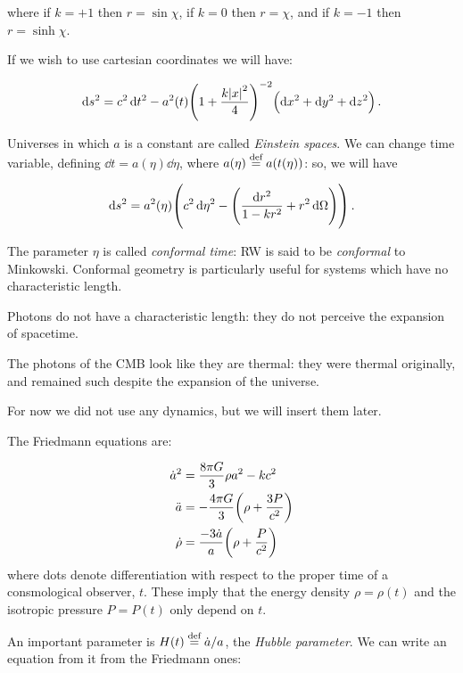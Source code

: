 \documentclass[main.tex]{subfiles}
\begin{document}
where if \(k = +1\)  then \(r = \sin \chi\), if \(k=0\)  then \(r=\chi\), and if \(k = -1\) then \(r = \sinh \chi\).

If we wish to use cartesian coordinates we will have:

\begin{equation}
  \dd{s^2} = c^2 \dd{t^2} - a^2 (t) \qty(1 + \frac{k \abs{x}^2}{4} )^{-2} \qty(\dd{x^2} + \dd{y^2} + \dd{z^2}) \,.
\end{equation}

Universes in which \(a\) is a constant are called \emph{Einstein spaces}.
We can change time variable, defining \(\dd{t} = a(\eta) \dd{\eta} \), where \(a(\eta) \stackrel{\text{def}}{=} a(t(\eta))\):  so, we will have

\begin{equation}
  \dd{s^2} = a^2 (\eta) \qty(c^2 \dd{\eta^2} - \qty(\frac{\dd{r^2}}{1 - kr^2} + r^2 \dd{\Omega})) \,.
\end{equation}

The parameter \(\eta\) is called \emph{conformal time}: RW is said to be \emph{conformal} to Minkowski.
Conformal geometry is particularly useful for systems which have no characteristic length.

Photons do not have a characteristic length: they do not perceive the expansion of spacetime.

The photons of the CMB look like they are thermal: they were thermal originally, and remained such despite the expansion of the universe.

For now we did not use any dynamics, but we will insert them later.

The Friedmann equations are:

\begin{subequations}
\begin{align}
    \dot{a}^2 &= \frac{8 \pi G }{3} \rho a^2 - kc^2  \\
    \ddot{a} &= - \frac{4 \pi G }{3}  \qty(\rho  + \frac{3P}{c^2} )  \\
    \dot{\rho} &= \frac{-3 \dot{a} }{a} \qty(\rho + \frac{P}{c^2} )
\end{align}
\end{subequations}
%
where dots denote differentiation with respect to the proper time of a consmological observer, \(t\).
These imply that the energy density \(\rho = \rho( t)\) and the isotropic pressure \(P = P(t)\) only depend on \(t\).

An important parameter is \(H(t) \stackrel{\text{def}}{=} \dot{a} / a\), the \emph{Hubble parameter}.
We can write an equation from it from the Friedmann ones:
\end{document}

